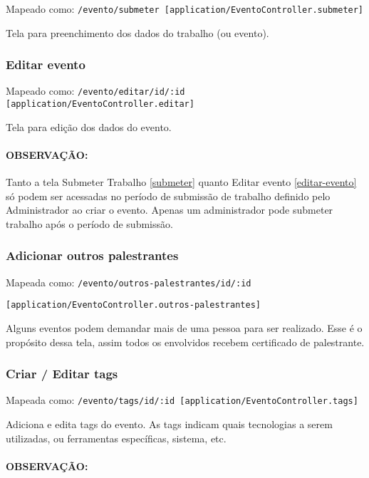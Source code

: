 Mapeado como:
\texttt{/evento/submeter {[}application/EventoController.submeter{]}}

Tela para preenchimento dos dados do trabalho (ou evento).

\subsubsection{Editar evento \label{editar-evento}}

Mapeado como:
\texttt{/evento/editar/id/:id {[}application/EventoController.editar{]}}

Tela para edição dos dados do evento.

\paragraph{OBSERVAÇÃO:}

Tanto a tela Submeter Trabalho \ref{submeter} quanto Editar evento
\ref{editar-evento} só podem ser acessadas no período de submissão de
trabalho definido pelo Administrador ao criar o evento. Apenas um
administrador pode submeter trabalho após o período de submissão.

\subsubsection{Adicionar outros palestrantes \label{add-palestrantes}}

Mapeada como: \texttt{/evento/outros-palestrantes/id/:id}

\texttt{{[}application/EventoController.outros-palestrantes{]}}

Alguns eventos podem demandar mais de uma pessoa para ser realizado.
Esse é o propósito dessa tela, assim todos os envolvidos recebem
certificado de palestrante.

\subsubsection{Criar / Editar tags \label{tags}}

Mapeada como:
\texttt{/evento/tags/id/:id {[}application/EventoController.tags{]}}

Adiciona e edita tags do evento. As tags indicam quais tecnologias a
serem utilizadas, ou ferramentas específicas, sistema, etc.

\paragraph{OBSERVAÇÃO:}

